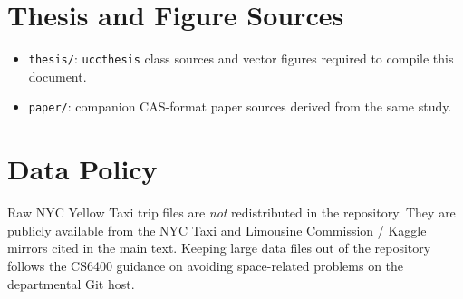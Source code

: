 \section{Thesis and Figure Sources}

\begin{itemize}
 \item \texttt{thesis/}: \texttt{uccthesis} class sources and vector figures required to compile this document.
 \item \texttt{paper/}: companion CAS-format paper sources derived from the same study.
\end{itemize}

\section{Data Policy}

Raw NYC Yellow Taxi trip files are \emph{not} redistributed in the repository. They are publicly available from the NYC Taxi and Limousine Commission / Kaggle mirrors cited in the main text. Keeping large data files out of the repository follows the CS6400 guidance on avoiding space-related problems on the departmental Git host.
